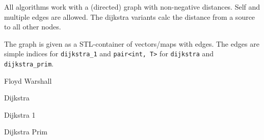 
All algorithms work with a (directed) graph with non-negative distances.
Self and multiple edges are allowed. The dijkstra variants calc the
distance from a source to all other nodes.

The graph is given as a STL-container of vectors/maps with edges. The edges
are simple indices for {\tt dijkstra\_1} and {\tt pair<int, T>} for
{\tt dijkstra} and {\tt dijkstra\_prim}.

\begin{algorithm}{Floyd Warshall}
\end{algorithm}

\begin{algorithm}{Dijkstra}
\end{algorithm}

\begin{algorithm}{Dijkstra 1}
\end{algorithm}

\begin{algorithm}{Dijkstra Prim}
\end{algorithm}
